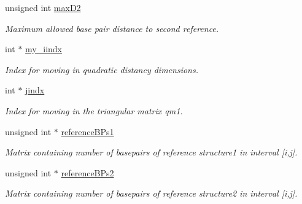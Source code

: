 \begin{DoxyCompactItemize}
\mbox{\label{structTwoDpfold__vars_a8900622d91454d2d037242e290e42834}} 
unsigned int \mbox{\hyperlink{structTwoDpfold__vars_a8900622d91454d2d037242e290e42834}{max\+D2}}
\begin{DoxyCompactList}\small\item\em Maximum allowed base pair distance to second reference. \end{DoxyCompactList}\item 
\mbox{\label{structTwoDpfold__vars_ac2d3e6abf0cb0e1df363904fc938076e}} 
int $\ast$ \mbox{\hyperlink{structTwoDpfold__vars_ac2d3e6abf0cb0e1df363904fc938076e}{my\+\_\+iindx}}
\begin{DoxyCompactList}\small\item\em Index for moving in quadratic distancy dimensions. \end{DoxyCompactList}\item 
\mbox{\label{structTwoDpfold__vars_a0699e194a797532c91b284ab10272384}} 
int $\ast$ \mbox{\hyperlink{structTwoDpfold__vars_a0699e194a797532c91b284ab10272384}{jindx}}
\begin{DoxyCompactList}\small\item\em Index for moving in the triangular matrix qm1. \end{DoxyCompactList}\item 
\mbox{\label{structTwoDpfold__vars_aea15706d27b6b0fc19f5773919f43a8a}} 
unsigned int $\ast$ \mbox{\hyperlink{structTwoDpfold__vars_aea15706d27b6b0fc19f5773919f43a8a}{reference\+B\+Ps1}}
\begin{DoxyCompactList}\small\item\em Matrix containing number of basepairs of reference structure1 in interval \mbox{[}i,j\mbox{]}. \end{DoxyCompactList}\item 
\mbox{\label{structTwoDpfold__vars_a1221396d712bf76b7f35297f2ab35a9f}} 
unsigned int $\ast$ \mbox{\hyperlink{structTwoDpfold__vars_a1221396d712bf76b7f35297f2ab35a9f}{reference\+B\+Ps2}}
\begin{DoxyCompactList}\small\item\em Matrix containing number of basepairs of reference structure2 in interval \mbox{[}i,j\mbox{]}. \end{DoxyCompactList}\item 

\end{DoxyCompactItemize}
